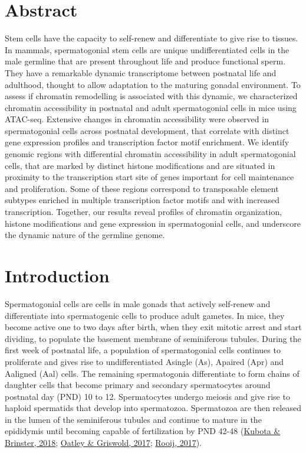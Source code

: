 \documentclass[12pt,twoside]{reedthesis}
\begin{document}
\hypertarget{abstract}{%
\section{Abstract}\label{abstract}}

Stem cells have the capacity to self-renew and differentiate to give
rise to tissues. In mammals, spermatogonial stem cells are unique
undifferentiated cells in the male germline that are present throughout
life and produce functional sperm. They have a remarkable dynamic
transcriptome between postnatal life and adulthood, thought to allow
adaptation to the maturing gonadal environment. To assess if chromatin
remodelling is associated with this dynamic, we characterized chromatin
accessibility in postnatal and adult spermatogonial cells in mice using
ATAC-seq. Extensive changes in chromatin accessibility were observed in
spermatogonial cells across postnatal development, that correlate with
distinct gene expression profiles and transcription factor motif
enrichment. We identify genomic regions with differential chromatin
accessibility in adult spermatogonial cells, that are marked by distinct
histone modifications and are situated in proximity to the transcription
start site of genes important for cell maintenance and proliferation.
Some of these regions correspond to transposable element subtypes
enriched in multiple transcription factor motifs and with increased
transcription. Together, our results reveal profiles of chromatin
organization, histone modifications and gene expression in
spermatogonial cells, and underscore the dynamic nature of the germline
genome.

\newpage

\hypertarget{introduction}{%
\section{Introduction}\label{introduction}}

Spermatogonial cells are cells in male gonads that actively self-renew
and differentiate into spermatogenic cells to produce adult gametes. In
mice, they become active one to two days after birth, when they exit
mitotic arrest and start dividing, to populate the basement membrane of
seminiferous tubules. During the first week of postnatal life, a
population of spermatogonial cells continues to proliferate and gives
rise to undifferentiated Asingle (As), Apaired (Apr) and Aaligned (Aal)
cells. The remaining spermatogonia differentiate to form chains of
daughter cells that become primary and secondary spermatocytes around
postnatal day (PND) 10 to 12. Spermatocytes undergo meiosis and give
rise to haploid spermatids that develop into spermatozoa. Spermatozoa
are then released in the lumen of the seminiferous tubules and continue
to mature in the epididymis until becoming capable of fertilization by
PND 42-48 (\protect\hyperlink{ref-kubota2018}{Kubota \& Brinster, 2018}; \protect\hyperlink{ref-thebiol2017}{Oatley \& Griswold, 2017}; \protect\hyperlink{ref-rooij2017}{Rooij, 2017}).
\end{document}
